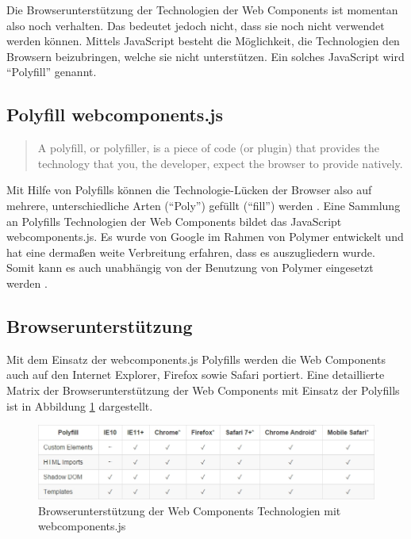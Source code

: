 Die Browserunterstützung der Technologien der Web Components ist momentan also noch verhalten. Das bedeutet jedoch nicht, dass sie noch nicht verwendet werden können. Mittels JavaScript besteht die Möglichkeit, die Technologien den Browsern beizubringen, welche sie nicht unterstützen. Ein solches JavaScript wird ``Polyfill'' genannt.


\subsection{Polyfill webcomponents.js}\label{polyfill-webcomponents.js}

\begin{quote}
A polyfill, or polyfiller, is a piece of code (or plugin) that provides the technology that you, the developer, expect the browser to provide natively. \cite{citeulike:13914241}
\end{quote}

Mit Hilfe von Polyfills können die Technologie-Lücken der Browser also auf mehrere, unterschiedliche Arten (``Poly'') gefüllt (``fill'') werden \cite{citeulike:13914234}. Eine Sammlung an Polyfills Technologien der Web Components bildet das JavaScript webcomponents.js. Es wurde von Google im Rahmen von Polymer entwickelt und hat eine dermaßen weite Verbreitung erfahren, dass es auszugliedern wurde. Somit kann es auch unabhängig von der Benutzung von Polymer eingesetzt werden \cite{citeulike:13914239}.


\subsection{Browserunterstützung}\label{polyfills-browserunterstuetzung}

Mit dem Einsatz der webcomponents.js Polyfills werden die Web Components auch auf den Internet Explorer, Firefox sowie Safari portiert. Eine detaillierte Matrix der Browserunterstützung der Web Components mit Einsatz der Polyfills ist in Abbildung \ref{fig:bdwctmwcjs} \cite{citeulike:13914238} dargestellt.

\begin{figure}[htbp]
 \centering
 \includegraphics[width=\linewidth]{kapitel2/bilder/6-webcomponentsjs-browserunterstuetzung}
 \caption{Browserunterstützung der Web Components Technologien mit webcomponents.js}
 \label{fig:bdwctmwcjs}
\end{figure}

